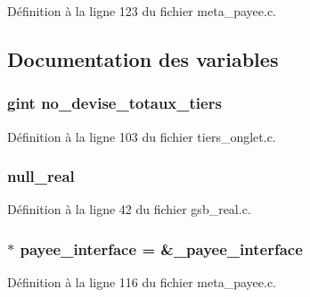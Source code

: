 Définition à la ligne 123 du fichier meta\_\-payee.c.



\subsection{Documentation des variables}
\subsubsection[{no\_\-devise\_\-totaux\_\-tiers}]{\setlength{\rightskip}{0pt plus 5cm}gint {\bf no\_\-devise\_\-totaux\_\-tiers}}\label{meta__payee_8c_a3add720d0e0b25caa37589bcfb879c6f}


Définition à la ligne 103 du fichier tiers\_\-onglet.c.

\subsubsection[{null\_\-real}]{ {\bf null\_\-real}}\label{meta__payee_8c_a26f304bec3fdc0651b9aa8765d4de3c6}


Définition à la ligne 42 du fichier gsb\_\-real.c.

\subsubsection[{payee\_\-interface}]{$\ast$ {\bf payee\_\-interface} = \&\_\-payee\_\-interface}\label{meta__payee_8c_a2b9ff3d909970141c14d4dd502841f70}


Définition à la ligne 116 du fichier meta\_\-payee.c.

